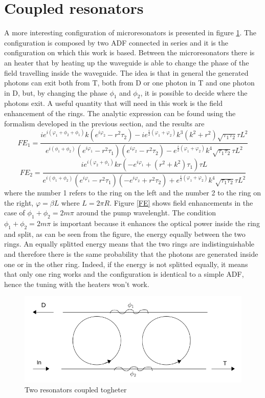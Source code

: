 \section{Coupled resonators} 
A more interesting configuration of microresonators is presented in figure \ref{resonatorcoupled}. The configuration is composed by two ADF connected in series and it is the configuration on which this work is based. Between the microresonators there is an heater that by heating up the waveguide is able to change the phase of the field travelling inside the waveguide. The idea is that in general the generated photons can exit both from T, both from D or one photon in T and one photon in D, but, by changing the phase $\phi_1$ and $\phi_2$, it is possible to decide where the photons exit. A useful quantity that will need in this work is the field enhancement of the rings. The analytic expression can be found using the formalism developed in the previous section, and the results are
\[FE_1 = \frac{ie^{i(\varphi_1+\phi_2+\phi_1)}k (e^{i\varphi_2}-r^2\tau_2)-ie^{\frac{i}{2}(\varphi_1+\varphi_2)}k^3(k^2+r^2)\sqrt{\tau_1\tau_2}\tau L^2}{e^{i(\phi_1+\phi_2)}(e^{i\varphi_1}-r^2\tau_1)(e^{i\varphi_2}-r^2\tau_2)-e^{\frac{i}{2}(\varphi_1+\varphi_2)}k^4\sqrt{\tau_1\tau_2}\tau L^2}\]
\[FE_2 = \frac{ie^{i(\varphi_2+\phi_1)}kr (-e^{i\varphi_1}+(r^2+k^2)\tau_1)\tau L}{e^{i(\phi_1+\phi_2)}(e^{i\varphi_1}-r^2\tau_1)(-e^{i\varphi_2}+r^2\tau_2)+e^{\frac{i}{2}(\varphi_1+\varphi_2)}k^4\sqrt{\tau_1\tau_2}\tau L^2}\]
where the number 1 refers to the ring on the left and the number 2 to the ring on the right, $\varphi = \beta L$ where $L=2\pi R$. Figure \ref{FE} shows field enhancements in the case of $\phi_1 + \phi_2 = 2m\pi$ around the pump wavelenght. The condition $\phi_1 + \phi_2 = 2m\pi$ is important because it enhances the optical power inside the ring and split, as can be seen from the figure, the energy equally between the two rings. An equally splitted energy means that the two rings are indistinguishable and therefore there is the same probability that the photons are generated inside one or in the other ring. Indeed, if the energy is not splitted equally, it means that only one ring works and the configuration is identical to a simple ADF, hence the tuning with the heaters won't work. 
\begin{figure}
\centering
\includegraphics[width = .7\textwidth]{img/coupled}
\caption{Two resonators coupled togheter}
\label{resonatorcoupled}
\end{figure}

